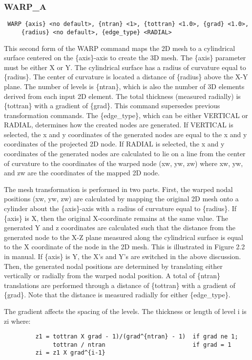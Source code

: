 \subsubsection{WARP\_A}
\begin{verbatim}
 WARP {axis} <no default>, {ntran} <1>, {tottran} <1.0>, {grad} <1.0>,
     {radius} <no default>, {edge_type} <RADIAL>
\end{verbatim}

This second form of the WARP command maps the 2D mesh to a cylindrical
surface centered on the \{axis\}-axis to create the 3D mesh.  The \{axis\}
parameter must be either X or Y.  The cylindrical surface has a radius
of curvature equal to \{radius\}.  The center of curvature is located a
distance of \{radius\} above the X-Y plane.  The number of levels is
\{ntran\}, which is also the number of 3D elements derived from each input
2D element.  The total thickness (measured radially) is \{tottran\} with a
gradient of \{grad\}.  This command supersedes previous transformation
commands.
The \{edge\_type\}, which can be either VERTICAL or RADIAL, determines how
the created nodes are generated.  If VERTICAL is selected, the x and y
coordinates of the generated nodes are equal to the x and y coordinates
of the projected 2D node.  If RADIAL is selected, the x and y
coordinates of the generated nodes are calculated to lie on a line from
the center of curvature to the coordinates of the warped node (xw, yw,
zw) where xw, yw, and zw are the coordinates of the mapped 2D node.

The mesh transformation is performed in two parts.  First, the warped
nodal positions (xw, yw, zw) are calculated by mapping the original 2D
mesh onto a cylinder about the \{axis\}-axis with a radius of curvature
equal to \{radius\}.  If \{axis\} is X, then the original X-coordinate
remains at the same value.  The generated Y and z coordinates are
calculated such that the distance from the generated node to the X-Z
plane measured along the cylindrical surface is equal to the X
coordinate of the node in the 2D mesh.  This is illustrated in Figure
2.2 in manual.  If \{axis\} is Y, the X's and Y's are switched in the
above discussion.  Then, the generated nodal positions are determined by
translating either vertically or radially from the warped nodal
position.  A total of \{ntran\} translations are performed through a
distance of \{tottran\} with a gradient of \{grad\}.  Note that the distance
is measured radially for either \{edge\_type\}. 

The gradient affects the spacing of the levels.  The thickness or length
of level i is zi where:  
\begin{verbatim}
         z1 = tottran X grad - 1)/(grad^{ntran} - 1)  if grad ne 1;
              tottran / ntran                         if grad = 1
         zi = z1 X grad^{i-1}
\end{verbatim}

